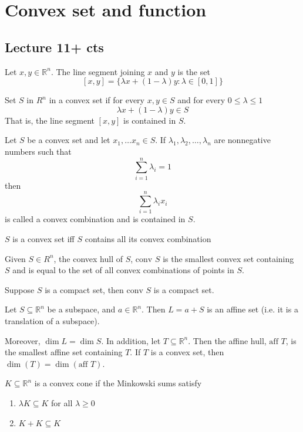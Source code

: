\section{Convex set and function}
\subsection{Lecture 11+ cts}
\begin{definition}
    Let $x,y \in \mathbb R^n$. The line segment joining $x$ and $y$ is the set
    $$[x,y] = \{\lambda x + (1 - \lambda)y : \lambda \in [0,1]\}$$
\end{definition}

\begin{definition}
    Set $S$ in $R^n$ in a convex set if for every $x, y \in S$ and for every  $0\leq \lambda \leq 1$ $$\lambda x+(1-\lambda)y\in S$$
    That is, the line segment $[x,y]$ is contained in $S$.
\end{definition}
\begin{definition}
    Let $S$ be a convex set and let $x_1,\ldots x_n \in S$. If $\lambda_1,\lambda_2,\ldots,\lambda_n$ are nonnegative numbers such that $$\sum_{i=1}^{n} \lambda_i = 1$$ then $$\sum^n_{i=1} \lambda_i x_i$$ is called a convex combination and is contained in $S$.
\end{definition}

\begin{lemma}
    $S$ is a convex set iff $S$ contains all its convex combination
\end{lemma}
\begin{definition}
    Given $S\in R^n$, the convex hull of $S$, $\text{conv }S$ is the smallest convex set containing $S$ and is equal to the set of all convex combinations of points in $S$.
\end{definition}

\begin{lemma}
    Suppose $S$ is a compact set, then $\text{conv }S$ is a compact set.
\end{lemma}
\begin{definition}
    Let $S \subseteq \mathbb R^n$ be a subspace, and $a \in \mathbb R^n$. Then $L = a + S$ is an affine set (i.e. it is a translation of a subspace).

    Moreover, $\dim L = \dim S$. In addition, let $T \subseteq \mathbb R^n$. Then the affine hull, $\text{aff }T$, is the smallest affine set containing $T$. If $T$ is a convex set, then $\dim(T) = \dim(\text{aff }T)$.
\end{definition}
\begin{definition}
    $K \subseteq \mathbb R^n$ is a convex cone if the Minkowski sums satisfy
    \begin{enumerate}
        \item $\lambda K \subseteq K$ for all $\lambda \geq 0$
        \item $K + K \subseteq K$
    \end{enumerate}
\end{definition}